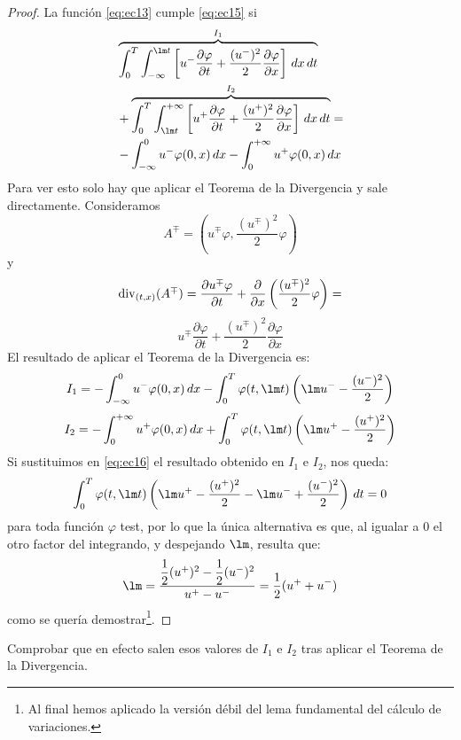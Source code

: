 \begin{proof}
    La función \eqref{eq:ec13} cumple \eqref{eq:ec15} si 
    \begin{equation}\label{eq:ec16}
        \begin{aligned}
            &\overbrace{\int_{0}^{T} \int_{-\infty}^{\lm t}
            \left[ u^{-} \dfrac{\partial \varphi}{\partial t}
            + \dfrac{(u^{-})^2}{2}
            \dfrac{\partial \varphi}{\partial x} \right]
            \,dx\,dt}^{I_1} \\
            &+ \overbrace{\int_{0}^{T} \int_{\lm t}^{+\infty}
            \left[ u^{+} \dfrac{\partial \varphi}{\partial t}
            + \dfrac{(u^{+})^2}{2}
            \dfrac{\partial \varphi}{\partial x} \right]
            \,dx\,dt}^{I_2} = \\
            &- \int_{-\infty}^{0} u^{-}\varphi(0,x)\,dx
            - \int_{0}^{+\infty} u^{+}\varphi(0,x)\,dx
        \end{aligned}
    \end{equation}
    Para ver esto solo hay que aplicar el Teorema de la Divergencia y sale directamente. Consideramos 
    $$A^{\mp} = \left(u^{\mp} \varphi, \dfrac{(u^{\mp})^2}{2} \varphi \right)$$
    y $$\text{div}_{(t,x)}(A^{\mp}) = \dfrac{\partial u^{\mp} \varphi}{\partial t} + \dfrac{\partial}{\partial x} \left( \dfrac{(u^{\mp})^2}{2} \varphi \right) = $$
    $$u^{\mp} \dfrac{\partial \varphi}{\partial t} + \dfrac{(u^{\mp})^2}{2} \dfrac{\partial \varphi}{\partial x}$$
    El resultado de aplicar el Teorema de la Divergencia es:
    $$I_1 = - \int_{-\infty}^{0} u^{-} \varphi(0,x) \,dx - \int_{0}^{T} \varphi(t, \lm t) \left( \lm u^{-} - \dfrac{(u^{-})^2}{2} \right)$$
    $$I_2 = - \int_{0}^{+\infty} u^{+} \varphi(0,x) \,dx + \int_{0}^{T} \varphi(t, \lm t) \left( \lm u^{+} - \dfrac{(u^{+})^2}{2} \right)$$
    Si sustituimos en \eqref{eq:ec16} el resultado obtenido en $I_1$ e $I_2$, nos queda:
    $$\int_{0}^{T} \varphi(t,\lm t) \left( \lm u^{+} - \dfrac{(u^+)^2}{2} - \lm u^{-} + \dfrac{(u^-)^2}{2} \right) \, dt = 0$$
    para toda función $\varphi$ test, por lo que la única alternativa es que, al igualar a $0$ el otro factor del integrando, y despejando $\lm$, resulta que:
    $$\lm = \dfrac{\dfrac{1}{2}(u^{+})^2 - \dfrac{1}{2}(u^{-})^2}{u^{+} - u^{-}} = \dfrac{1}{2}(u^{+} + u^{-})$$
    como se quería demostrar\footnote{Al final hemos aplicado la versión débil del lema fundamental del cálculo de variaciones.}.
\end{proof}

\begin{ejercicio} %
    Comprobar que en efecto salen esos valores de $I_1$ e $I_2$ tras aplicar el Teorema de la Divergencia.
\end{ejercicio}

